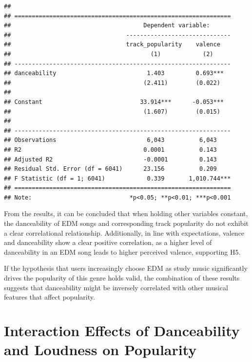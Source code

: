 \documentclass[
]{book}
\begin{document}
\begin{verbatim}
## 
## ==============================================================
##                                      Dependent variable:      
##                                 ------------------------------
##                                 track_popularity    valence   
##                                        (1)            (2)     
## --------------------------------------------------------------
## danceability                          1.403         0.693***  
##                                      (2.411)        (0.022)   
##                                                               
## Constant                            33.914***      -0.053***  
##                                      (1.607)        (0.015)   
##                                                               
## --------------------------------------------------------------
## Observations                          6,043          6,043    
## R2                                   0.0001          0.143    
## Adjusted R2                          -0.0001         0.143    
## Residual Std. Error (df = 6041)      23.156          0.209    
## F Statistic (df = 1; 6041)            0.339       1,010.744***
## ==============================================================
## Note:                            *p<0.05; **p<0.01; ***p<0.001
\end{verbatim}

From the results, it can be concluded that when holding other variables constant, the danceability of EDM songs and corresponding track popularity do not exhibit a clear correlational relationship. Additionally, in line with expectations, valence and danceability show a clear positive correlation, as a higher level of danceability in an EDM song leads to higher perceived valence, supporting H5.

If the hypothesis that users increasingly choose EDM as study music significantly drives the popularity of this genre holds valid, the combination of these results suggests that danceability might be inversely correlated with other musical features that affect popularity.

\hypertarget{interaction-effects-of-danceability-and-loudness-on-popularity}{%
\section{Interaction Effects of Danceability and Loudness on Popularity}\label{interaction-effects-of-danceability-and-loudness-on-popularity}}
\end{document}

